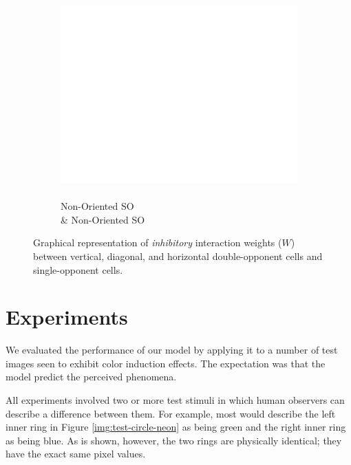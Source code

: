 \documentclass[journal,onecolumn]{IEEEtran}
\begin{document}
\begin{figure}[htbp!]
\begin{subfigure}[b]{0.2\textwidth}
            \captionsetup{justification=centering}
            \includegraphics[width=.85\linewidth]{map-w_blank}
            \caption{\\ Non-Oriented SO \\ \& Non-Oriented SO}
    \end{subfigure}%
    \caption{Graphical representation of \textit{inhibitory} interaction weights ($W$) between vertical, diagonal, and horizontal double-opponent cells and single-opponent cells.}
\end{figure}

\newpage

%
%
%
\section{Experiments}

We evaluated the performance of our model by applying it to a number of test images seen to exhibit color induction effects. The expectation was that the model predict the perceived phenomena.

All experiments involved two or more test stimuli in which human observers can describe a difference between them. For example, most would describe the left inner ring in Figure \ref{img:test-circle-neon} as being green and the right inner ring as being blue. As is shown, however, the two rings are physically identical; they have the exact same pixel values.
\end{document}
